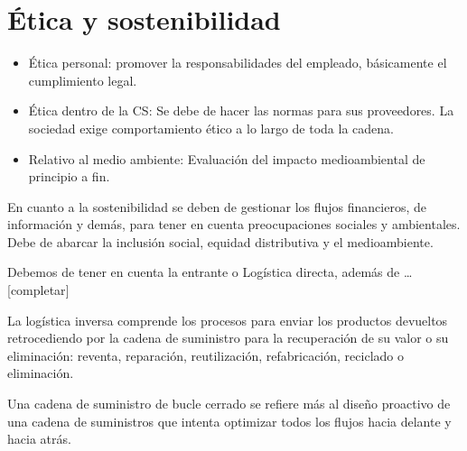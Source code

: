 \documentclass[12pt]{book} %
\providecommand{\tightlist}{%
  \setlength{\itemsep}{0pt}\setlength{\parskip}{0pt}}
\begin{document}
\hypertarget{uxe9tica-y-sostenibilidad}{%
\section{Ética y sostenibilidad}\label{uxe9tica-y-sostenibilidad}}

\begin{itemize}
\tightlist
\item
  Ética personal: promover la responsabilidades del empleado,
  básicamente el cumplimiento legal.
\item
  Ética dentro de la CS: Se debe de hacer las normas para sus
  proveedores. La sociedad exige comportamiento ético a lo largo de toda
  la cadena.
\item
  Relativo al medio ambiente: Evaluación del impacto medioambiental de
  principio a fin.
\end{itemize}

En cuanto a la sostenibilidad se deben de gestionar los flujos
financieros, de información y demás, para tener en cuenta preocupaciones
sociales y ambientales. Debe de abarcar la inclusión social, equidad
distributiva y el medioambiente.

Debemos de tener en cuenta la entrante o Logística directa, además de
\ldots{[}completar{]}

\begin{definicion}
La logística inversa comprende los procesos para enviar los productos devueltos retrocediendo por la cadena de suministro para la recuperación de su valor o su eliminación: reventa, reparación, reutilización, refabricación, reciclado o eliminación.
\end{definicion}

Una cadena de suministro de bucle cerrado se refiere más al diseño
proactivo de una cadena de suministros que intenta optimizar todos los
flujos hacia delante y hacia atrás.


\end{document}
